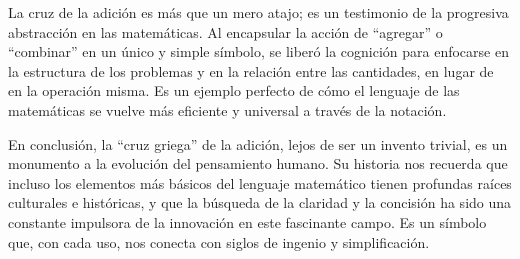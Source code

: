 \documentclass[11pt, a4paper]{article}
\begin{document}
La cruz de la adición es más que un mero atajo; es un testimonio de la progresiva abstracción en las matemáticas. Al encapsular la acción de ``agregar'' o ``combinar'' en un único y simple símbolo, se liberó la cognición para enfocarse en la estructura de los problemas y en la relación entre las cantidades, en lugar de en la operación misma. Es un ejemplo perfecto de cómo el lenguaje de las matemáticas se vuelve más eficiente y universal a través de la notación.

En conclusión, la ``cruz griega'' de la adición, lejos de ser un invento trivial, es un monumento a la evolución del pensamiento humano. Su historia nos recuerda que incluso los elementos más básicos del lenguaje matemático tienen profundas raíces culturales e históricas, y que la búsqueda de la claridad y la concisión ha sido una constante impulsora de la innovación en este fascinante campo. Es un símbolo que, con cada uso, nos conecta con siglos de ingenio y simplificación.
\end{document}
